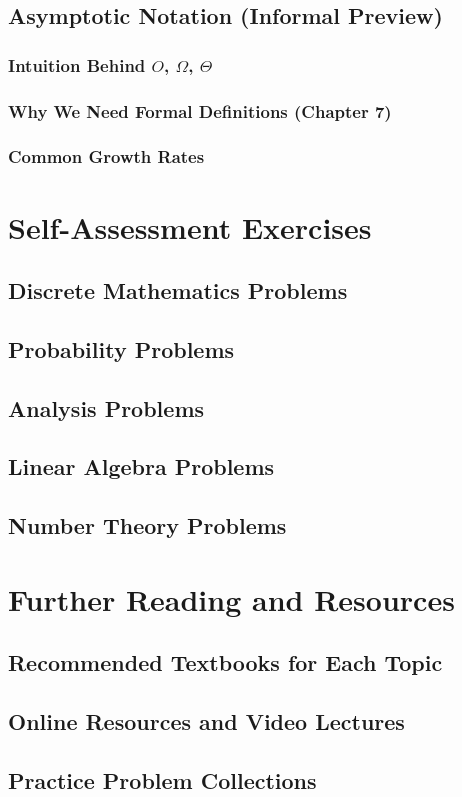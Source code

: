 \subsection{Asymptotic Notation (Informal Preview)}
\subsubsection{Intuition Behind $O$, $\Omega$, $\Theta$}
\subsubsection{Why We Need Formal Definitions (Chapter 7)}
\subsubsection{Common Growth Rates}

\section{Self-Assessment Exercises}
\subsection{Discrete Mathematics Problems}
\subsection{Probability Problems}
\subsection{Analysis Problems}
\subsection{Linear Algebra Problems}
\subsection{Number Theory Problems}

\section{Further Reading and Resources}
\subsection{Recommended Textbooks for Each Topic}
\subsection{Online Resources and Video Lectures}
\subsection{Practice Problem Collections}
